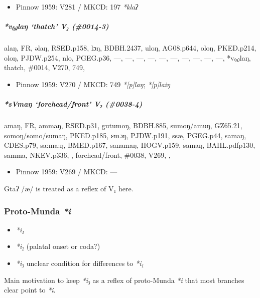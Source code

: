 \documentclass[a4paper,]{article}
\providecommand{\tightlist}{%
  \setlength{\itemsep}{0pt}\setlength{\parskip}{0pt}}
\let\oldsubparagraph\subparagraph
\renewcommand{\subparagraph}[1]{\oldsubparagraph{#1}\mbox{}}
\begin{document}
\begin{itemize}
\tightlist
\item
  Pinnow 1959: V281 / MKCD: 197 \emph{*klaʔ}
\end{itemize}

\subparagraph{\texorpdfstring{\emph{*v₍₉₎laŋ} `thatch' V₂
(\#0014-3)}{*v₍₉₎laŋ thatch V₂ (\#0014-3)}}\label{vlaux14b-thatch-v-0014-3}

alaŋ, FR, əlaŋ, RSED.p158, lɔŋ, BDBH.2437, uloŋ, AG08.p644, oloŋ,
PKED.p214, oloŋ, PJDW.p254, nlo, PGEG.p36, ---, ---, ---, ---, ---, ---,
---, ---, ---, ---, *v₍₉₎laŋ, thatch, \#0014, V270, 749,

\begin{itemize}
\tightlist
\item
  Pinnow 1959: V270 / MKCD: 749 \emph{*{[}p{]}laŋ}; \emph{*{[}p{]}laiŋ}
\end{itemize}

\subparagraph{\texorpdfstring{\emph{*sVmaŋ} `forehead/front' V₂
(\#0038-4)}{*sVmaŋ forehead/front V₂ (\#0038-4)}}\label{svmaux14b-foreheadfront-v-0038-4}

amaŋ, FR, ammaŋ, RSED.p31, gutumoŋ, BDBH.885, sumoŋ/amuŋ, GZ65.21,
somoŋ/somo/sumaŋ, PKED.p185, ɛmɔŋ, PJDW.p191, ssæ, PGEG.p44, samaŋ,
CDES.p79, sa:ma:ŋ, BMED.p167, sanamaŋ, HOGV.p159, samaŋ, BAHL.pdfp130,
samma, NKEV.p336, , forehead/front, \#0038, V269, ,

\begin{itemize}
\tightlist
\item
  Pinnow 1959: V269 / MKCD: ---
\end{itemize}

Gtaʔ /æ/ is treated as a reflex of V₁ here.

\subsubsection{\texorpdfstring{Proto-Munda
\emph{*i}}{Proto-Munda *i}}\label{proto-munda-i}

\begin{itemize}
\tightlist
\item
  \emph{*i₁}
\item
  \emph{*i₂} (palatal onset or coda?)
\item
  \emph{*i₃} unclear condition for differences to \emph{*i₁}
\end{itemize}

Main motivation to keep \emph{*i₃} as a reflex of proto-Munda \emph{*i}
that most branches clear point to \emph{*i}.
\end{document}
